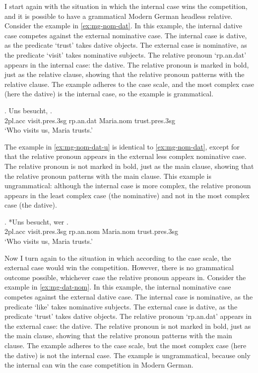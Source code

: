 I start again with the situation in which the internal case wins the competition, and it is possible to have a grammatical Modern German headless relative.
Consider the example in \ref{ex:mg-nom-dat}. In this example, the internal dative case competes against the external nominative case.
The internal case is dative, as the predicate  `trust' takes dative objects.
The external case is nominative, as the predicate  `visit' takes nominative subjects.
The relative pronoun  `\ac{rp}.\ac{an}.\ac{dat}' appears in the internal case: the dative. The relative pronoun is marked in bold, just as the relative clause, showing that the relative pronoun patterns with the relative clause.
The example adheres to the case scale, and the most complex case (here the dative) is the internal case, so the example is grammatical.

\exg. Uns besucht,   .\\
2\ac{pl}.\ac{acc} visit.\ac{pres}.3\ac{sg}\scsub{[nom]} \ac{rp}.\ac{an}.\ac{dat} Maria.\ac{nom} trust.\ac{pres}.3\ac{sg}\scsub{[dat]}\\
`Who visits us, Maria trusts.' \label{ex:mg-nom-dat}

The example in \ref{ex:mg-nom-dat-u} is identical to \ref{ex:mg-nom-dat}, except for that the relative pronoun appears in the external less complex nominative case.
The relative pronoun is not marked in bold, just as the main clause, showing that the relative pronoun patterns with the main clause.
This example is ungrammatical: although the internal case is more complex, the relative pronoun appears in the least complex case (the nominative) and not in the most complex case (the dative).

\exg. *Uns besucht, wer  .\\
2\ac{pl}.\ac{acc} visit.\ac{pres}.3\ac{sg}\scsub{[nom]} \ac{rp}.\ac{an}.\ac{nom} Maria.\ac{nom} trust.\ac{pres}.3\ac{sg}\scsub{[dat]}\\
`Who visits us, Maria trusts.' \label{ex:mg-nom-dat-u}

Now I turn again to the situation in which according to the case scale, the external case would win the competition. However, there is no grammatical outcome possible, whichever case the relative pronoun appears in.
Consider the example in \ref{ex:mg-dat-nom}. In this example, the internal nominative case competes against the external dative case.
The internal case is nominative, as the predicate  `like' takes nominative subjects.
The external case is dative, as the predicate  `trust' takes dative objects.
The relative pronoun  `\ac{rp}.\ac{an}.\ac{dat}' appears in the external case: the dative. The relative pronoun is not marked in bold, just as the main clause, showing that the relative pronoun patterns with the main clause.
The example adheres to the case scale, but the most complex case (here the dative) is not the internal case. The example is ungrammatical, because only the internal can win the case competition in Modern German.

